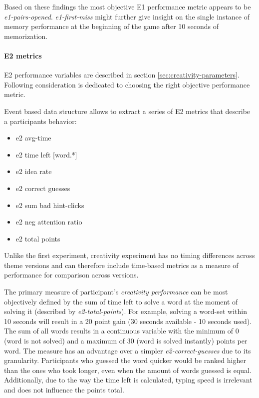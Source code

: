 	Based on these findings the most objective E1 performance metric appears to be \textit{e1-pairs-opened}.
	\textit{e1-first-miss} might further give insight on the single instance of memory performance at the beginning of the game after 10 seconds of memorization.
	
	\paragraph{E2 metrics}
	
	E2 performance variables are described in section \ref{sec:creativity-parameters}. Following consideration is dedicated to choosing the right objective performance metric.
	
	Event based data structure allows to extract a series of E2 metrics that describe a participants behavior:
	\begin{itemize}
		\item e2 avg-time 
		\item e2 time left [word.*]  
		\item e2 idea rate 
		\item e2 correct guesses
		\item e2 sum bad hint-clicks 
		\item e2 neg attention ratio
		\item e2 total points
	\end{itemize}
	
	Unlike the first experiment, creativity experiment has no timing differences across theme versions and can therefore include time-based metrics as a measure of performance for comparison across versions.
	
	The primary measure of participant's \textit{creativity performance} can be most objectively defined by the sum of time left to solve a word at the moment of solving it (described by \textit{e2-total-points}). For example, solving a word-set within 10 seconds will result in a 20 point gain (30 seconds available - 10 seconds used). The sum of all words results in a continuous variable with the minimum of 0 (word is not solved) and a maximum of 30 (word is solved instantly) points per word. The measure has an advantage over a simpler \textit{e2-correct-guesses} due to its granularity. Participants who guessed the word quicker would be ranked higher than the ones who took longer, even when the amount of words guessed is equal. Additionally, due to the way the time left is calculated, typing speed is irrelevant and does not influence the points total.
	
